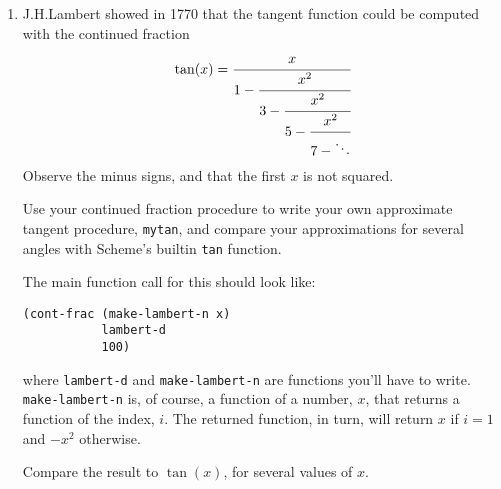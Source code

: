 \documentclass{article}
\begin{document}
\begin{multicols}{2}
\begin{description}
\begin{enumerate}
The main function call for this could look like this,
  where {\tt euler-d} is a function you'll have to write:
  \begin{verbatim}
(cont-frac (lambda (x) 1.0)
           euler-d
           100)
\end{verbatim}
  Then add 2 and compare it to $e$.


\item
J.H.Lambert showed in 1770 that the tangent function could be computed
with the continued fraction
\[
\tan(x) = \cfrac{x}{1 - \cfrac{x^2}{3 - \cfrac{x^2}{5 - \cfrac{x^2}{7
        - \ddots}}}}
\]
Observe the minus signs, and that the first $x$ is not squared.

Use your continued fraction procedure to 
write your own approximate tangent procedure, {\tt mytan}, and compare
your approximations for several angles with Scheme's builtin {\tt tan} 
function.

 The main function call for this should look like:
  \begin{verbatim}
(cont-frac (make-lambert-n x)   
           lambert-d
           100)
\end{verbatim}
  where {\tt lambert-d} and {\tt make-lambert-n} are functions you'll
  have to write.  {\tt make-lambert-n} is, of course, a function of
  a number, $x$, that returns a function of the index, $i$.  The
  returned function, in turn, will
  return $x$ if $i=1$ and $-x^2$ otherwise.

  Compare the result to $\tan(x)$, for several values of $x$.

\end{enumerate}


\end{description}


\end{multicols}
\end{document}
